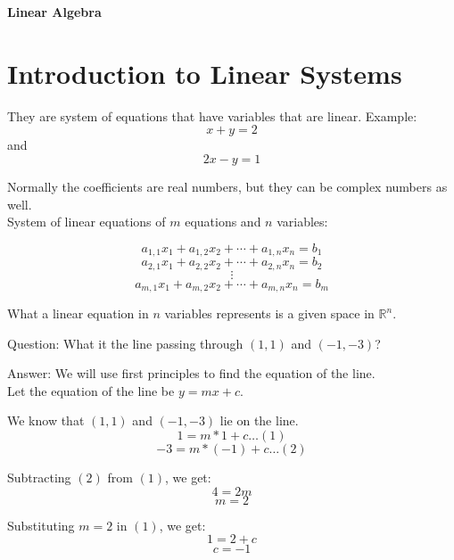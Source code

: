 \documentclass{article}
\begin{document}
\begin{center}
    \begin{LARGE}
        \textbf{Linear Algebra}
    \end{LARGE}
\end{center}

\section{Introduction to Linear Systems}
They are system of equations that have variables that are linear.
Example: \[x + y = 2\] and \[2x - y = 1\]

Normally the coefficients are real numbers, but they can be complex numbers as well. \\[1pt]
System of linear equations of $m$ equations and $n$ variables:

\[
    a_{1,1} x_1 + a_{1,2} x_2 + \cdots + a_{1,n} x_n = b_1
    \]
    \[
    a_{2,1} x_1 + a_{2,2} x_2 + \cdots + a_{2,n} x_n = b_2
    \]
    \[
    \vdots
    \]
    \[
    a_{m,1} x_1 + a_{m,2} x_2 + \cdots + a_{m,n} x_n = b_m
    \]

What a linear equation in $n$ variables represents is a given space in $\mathbb{R}^n$.

\begin{paragraph}{Question:}
What it the line passing through $(1,1)$ and $(-1,-3)$?
\end{paragraph}     
\begin{paragraph}{Answer:}
    We will use first principles to find the equation of the line.\\[1pt]
    Let the equation of the line be $y = mx + c$.
    
    We know that $(1,1)$ and $(-1,-3)$ lie on the line.\\[1pt]
    \[1 = m*1 + c \dots (1)\]
    \[-3 = m*(-1) + c \dots (2)\]

    Subtracting $(2)$ from $(1)$, we get:
    \[4 = 2m\]
    \[m = 2\]

    Substituting $m = 2$ in $(1)$, we get:
    \[1 = 2 + c\]
    \[c = -1\]
    
\end{paragraph}
\end{document}
